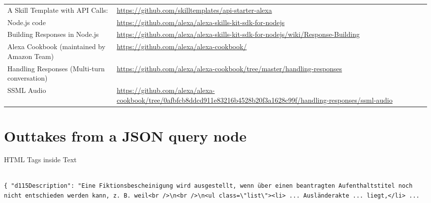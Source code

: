 \begin{flushleft}
	\begin{tabularx}{\textwidth}{lX}
		
		
A Skill Template with API Calls: & 
\url{https://github.com/skilltemplates/api-starter-alexa}\\

Node.js code &
\url{https://github.com/alexa/alexa-skills-kit-sdk-for-nodejs}\\

Building Responses in Node.js & 
\url{https://github.com/alexa/alexa-skills-kit-sdk-for-nodejs/wiki/Response-Building}\\


Alexa Cookbook (maintained by Amazon Team) & 
\url{https://github.com/alexa/alexa-cookbook/}\\

Handling Responses (Multi-turn conversation) & 
\url{https://github.com/alexa/alexa-cookbook/tree/master/handling-responses}\\
		
SSML Audio & 
\url{https://github.com/alexa/alexa-cookbook/tree/0afbfcb8ddcd911e83216b4528b20f3a1628c99f/handling-responses/ssml-audio}\\
		
	\end{tabularx}
\end{flushleft}







\clearpage

\section*{Outtakes from a JSON query node}
\label{query:dl}

HTML Tags inside Text
\begin{verbatim}

{ "d115Description": "Eine Fiktionsbescheinigung wird ausgestellt, wenn über einen beantragten Aufenthaltstitel noch nicht entschieden werden kann, z. B. weil<br />\n<br />\n<ul class=\"list\"><li> ... Ausländerakte ... liegt,</li> ...
\end{verbatim}

